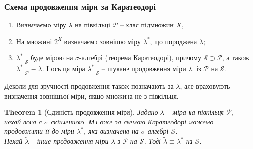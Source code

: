 \documentclass[a4paper, 10pt]{article}
\theoremstyle{theoremdd}
\newtheorem{theorem}{Theorem}[subsection]
\begin{document}
\subsubsection*{Схема продовження міри за Каратеодорі}
\begin{enumerate}[nosep,wide=0pt,label={\arabic*)}]
\item Визначаємо міру $\lambda$ на півкільці $\mathcal{P}$ -- клас підмножин $X$;
\item На множині $2^X$ визначаємо зовнішю міру $\lambda^*$, що породжена $\lambda$;
\item $\lambda^*|_{\mathcal{S}}$ буде мірою на $\sigma$-алгебрі (теорема Каратеодорі), причому $\mathcal{S} \supset \mathcal{P}$, а також $\lambda^*|_{\mathcal{P}} \equiv \lambda$. І ось ця міра $\lambda^*|_{\mathcal{S}}$ -- шукане продовження міри $\lambda$. із $\mathcal{P}$ на $\mathcal{S}$.\\ \end{enumerate}
\noindent
Деколи для зручності продовження також позначають за $\lambda$, але враховують визначення зовнішьої міри, якщо множина не з півкільця.

\begin{theorem}[Єдиність продовження міри]
Задано $\lambda$ -- міра на півкільця $\mathcal{P}$, нехай вона є $\sigma$-скінченною. Ми вже за схемою Каратеодорі можемо продовжити її до міри $\lambda^*$, яка визначена на $\sigma$-алгебрі $\mathcal{S}$.\\
Нехай $\tilde{\lambda}$ -- інше продовження міри $\lambda$ з $\mathcal{P}$ на $\mathcal{S}$. Тоді $\tilde{\lambda} \equiv \lambda^*$ на $\mathcal{S}$.
\end{theorem}
\end{document}
